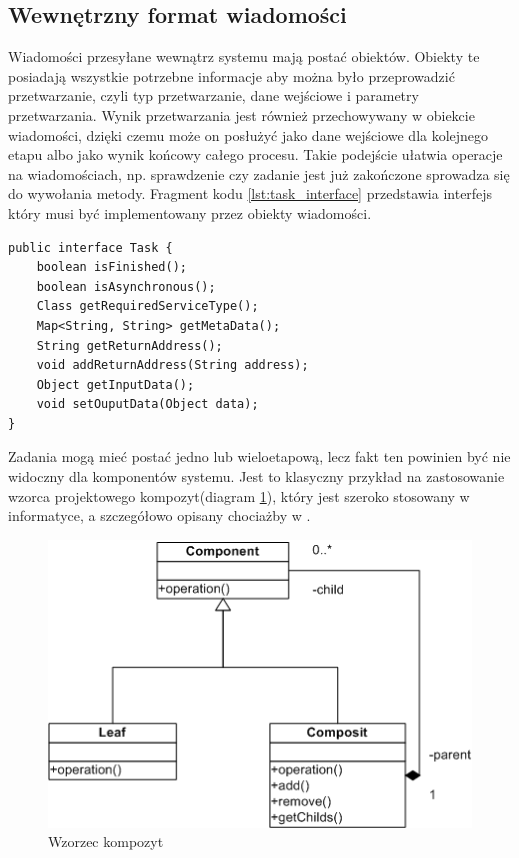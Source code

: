\subsection{Wewnętrzny format wiadomości}
Wiadomości przesyłane wewnątrz systemu mają postać obiektów. Obiekty te posiadają wszystkie potrzebne informacje aby można było przeprowadzić przetwarzanie, czyli typ przetwarzanie, dane wejściowe i parametry przetwarzania. Wynik przetwarzania jest również przechowywany w obiekcie wiadomości, dzięki czemu może on posłużyć jako dane wejściowe dla kolejnego etapu albo jako wynik końcowy całego procesu. Takie podejście ułatwia operacje na wiadomościach, np. sprawdzenie czy zadanie jest już zakończone sprowadza się do wywołania metody. Fragment kodu \ref{lst:task_interface} przedstawia interfejs który musi być implementowany przez obiekty wiadomości.

\lstset{language=Java, tabsize=4, caption=Definicja interfejsu Task w języku Java.,label=lst:task_interface}

\begin{center}
\begin{lstlisting}
public interface Task {
	boolean isFinished();
	boolean isAsynchronous();
	Class getRequiredServiceType();
	Map<String, String> getMetaData();
	String getReturnAddress();
	void addReturnAddress(String address);
	Object getInputData();
	void setOuputData(Object data);
}
\end{lstlisting}
\end{center}

Zadania mogą mieć postać jedno lub wieloetapową, lecz fakt ten powinien być nie widoczny dla komponentów systemu. Jest to klasyczny przykład na zastosowanie wzorca projektowego kompozyt(diagram \ref{fig:composite_pattern}), który jest szeroko stosowany w informatyce, a szczegółowo opisany chociażby w \cite{gamma1995}.

\begin{figure}[!h]
	\centering
	\includegraphics[scale=0.7]{composit_pattern.png}
	\caption{Wzorzec kompozyt}\label{fig:composite_pattern}
\end{figure}

